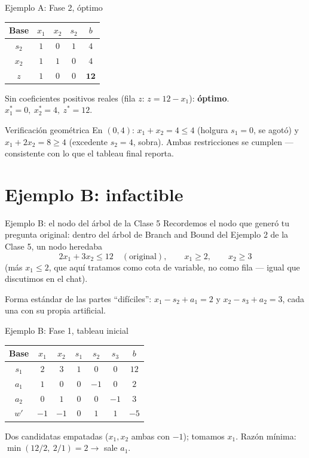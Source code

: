 \documentclass[aspectratio=169]{beamer}
\begin{document}
\begin{frame}{Ejemplo A: Fase 2, óptimo}
\begin{center}
\renewcommand{\arraystretch}{1.25}
\begin{tabular}{c|ccc|c}
\textbf{Base} & $x_1$ & $x_2$ & $s_2$ & $b$ \\
\hline
$s_2$ & $1$ & $0$ & $1$ & $4$ \\
$x_2$ & $1$ & $1$ & $0$ & $4$ \\
\hline
$z$ & $1$ & $0$ & $0$ & $\mathbf{12}$ \\
\end{tabular}
\end{center}

Sin coeficientes positivos reales (fila $z$: $z=12-x_1$): \textbf{óptimo}. $x_1^\ast=0,\ x_2^\ast=4,\ z^\ast=12$.

\begin{block}{Verificación geométrica}
En $(0,4)$: $x_1+x_2=4\leq4$ (holgura $s_1=0$, se agotó) y $x_1+2x_2=8\geq4$ (excedente $s_2=4$, sobra). Ambas restricciones se cumplen --- consistente con lo que el tableau final reporta.
\end{block}
\end{frame}

\section{Ejemplo B: infactible}

\begin{frame}{Ejemplo B: el nodo del árbol de la Clase 5}
Recordemos el nodo que generó tu pregunta original: dentro del árbol de Branch and Bound del Ejemplo 2 de la Clase 5, un nodo heredaba
\[
2x_1+3x_2\leq12 \quad(\text{original}), \qquad x_1\geq2, \qquad x_2\geq3
\]
(más $x_1\leq2$, que aquí tratamos como cota de variable, no como fila --- igual que discutimos en el chat).

Forma estándar de las partes ``difíciles'': $x_1-s_2+a_1=2$ y $x_2-s_3+a_2=3$, cada una con su propia artificial.
\end{frame}

\begin{frame}{Ejemplo B: Fase 1, tableau inicial}
\begin{center}
\renewcommand{\arraystretch}{1.2}
\small
\begin{tabular}{c|ccccc|c}
\textbf{Base} & $x_1$ & $x_2$ & $s_1$ & $s_2$ & $s_3$ & $b$ \\
\hline
$s_1$ & $2$ & $3$ & $1$ & $0$ & $0$ & $12$ \\
$a_1$ & $1$ & $0$ & $0$ & $-1$ & $0$ & $2$ \\
$a_2$ & $0$ & $1$ & $0$ & $0$ & $-1$ & $3$ \\
\hline
$w'$ & \cellcolor{entra!20}$-1$ & $-1$ & $0$ & $1$ & $1$ & $-5$ \\
\end{tabular}
\end{center}
\normalsize

\vspace{0.2cm}
Dos candidatas empatadas ($x_1,x_2$ ambas con $-1$); tomamos $x_1$. Razón mínima: $\min(12/2,\ 2/1)=2\to$ sale $a_1$.
\end{frame}
\end{document}
